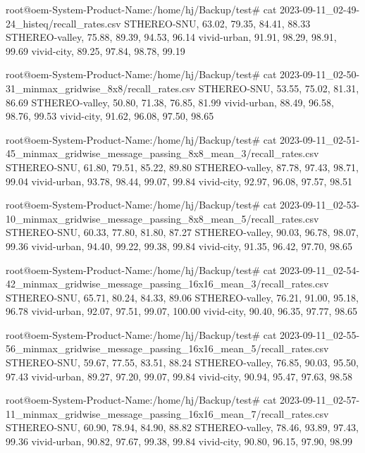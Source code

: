 root@oem-System-Product-Name:/home/hj/Backup/test# cat 2023-09-11_02-49-24_histeq/recall_rates.csv 
STHEREO-SNU, 63.02, 79.35, 84.41, 88.33
STHEREO-valley, 75.88, 89.39, 94.53, 96.14
vivid-urban, 91.91, 98.29, 98.91, 99.69
vivid-city, 89.25, 97.84, 98.78, 99.19

root@oem-System-Product-Name:/home/hj/Backup/test# cat 2023-09-11_02-50-31_minmax_gridwise_8x8/recall_rates.csv 
STHEREO-SNU, 53.55, 75.02, 81.31, 86.69
STHEREO-valley, 50.80, 71.38, 76.85, 81.99
vivid-urban, 88.49, 96.58, 98.76, 99.53
vivid-city, 91.62, 96.08, 97.50, 98.65

root@oem-System-Product-Name:/home/hj/Backup/test# cat 2023-09-11_02-51-45_minmax_gridwise_message_passing_8x8_mean_3/recall_rates.csv 
STHEREO-SNU, 61.80, 79.51, 85.22, 89.80
STHEREO-valley, 87.78, 97.43, 98.71, 99.04
vivid-urban, 93.78, 98.44, 99.07, 99.84
vivid-city, 92.97, 96.08, 97.57, 98.51

root@oem-System-Product-Name:/home/hj/Backup/test# cat 2023-09-11_02-53-10_minmax_gridwise_message_passing_8x8_mean_5/recall_rates.csv 
STHEREO-SNU, 60.33, 77.80, 81.80, 87.27
STHEREO-valley, 90.03, 96.78, 98.07, 99.36
vivid-urban, 94.40, 99.22, 99.38, 99.84
vivid-city, 91.35, 96.42, 97.70, 98.65

root@oem-System-Product-Name:/home/hj/Backup/test# cat 2023-09-11_02-54-42_minmax_gridwise_message_passing_16x16_mean_3/recall_rates.csv 
STHEREO-SNU, 65.71, 80.24, 84.33, 89.06
STHEREO-valley, 76.21, 91.00, 95.18, 96.78
vivid-urban, 92.07, 97.51, 99.07, 100.00
vivid-city, 90.40, 96.35, 97.77, 98.65

root@oem-System-Product-Name:/home/hj/Backup/test# cat 2023-09-11_02-55-56_minmax_gridwise_message_passing_16x16_mean_5/recall_rates.csv 
STHEREO-SNU, 59.67, 77.55, 83.51, 88.24
STHEREO-valley, 76.85, 90.03, 95.50, 97.43
vivid-urban, 89.27, 97.20, 99.07, 99.84
vivid-city, 90.94, 95.47, 97.63, 98.58

root@oem-System-Product-Name:/home/hj/Backup/test# cat 2023-09-11_02-57-11_minmax_gridwise_message_passing_16x16_mean_7/recall_rates.csv 
STHEREO-SNU, 60.90, 78.94, 84.90, 88.82
STHEREO-valley, 78.46, 93.89, 97.43, 99.36
vivid-urban, 90.82, 97.67, 99.38, 99.84
vivid-city, 90.80, 96.15, 97.90, 98.99
